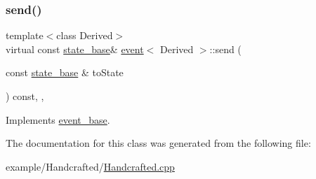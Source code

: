 \subsubsection{\texorpdfstring{send()}{send()}}
{\footnotesize\ttfamily template$<$class Derived$>$ \\
virtual const \mbox{\hyperlink{classstate__base}{state\+\_\+base}}\& \mbox{\hyperlink{classevent}{event}}$<$ Derived $>$\+::send (\begin{DoxyParamCaption}\item[{const \mbox{\hyperlink{classstate__base}{state\+\_\+base}} \&}]{to\+State }\end{DoxyParamCaption}) const\hspace{0.3cm}{\ttfamily [inline]}, {\ttfamily [private]}, {\ttfamily [virtual]}}



Implements \mbox{\hyperlink{classevent__base_aa145c3849ff0fa69e656cb88a5de80a7}{event\+\_\+base}}.



The documentation for this class was generated from the following file\+:\begin{DoxyCompactItemize}
\item 
example/\+Handcrafted/\mbox{\hyperlink{_handcrafted_8cpp}{Handcrafted.\+cpp}}\end{DoxyCompactItemize}
